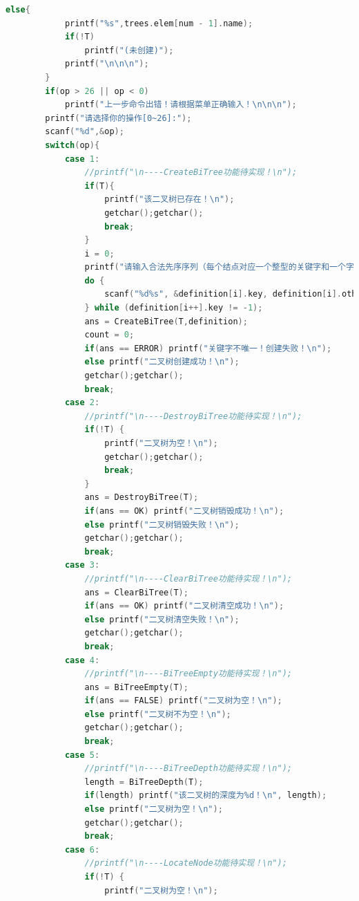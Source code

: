 \documentclass[supercite]{Experimental_Report}
\theoremstyle{definition}
\begin{document}
\begin{lstlisting}[language=c]
        else{
        	printf("%s",trees.elem[num - 1].name);
        	if(!T)
                printf("(未创建)");
            printf("\n\n\n");
		}   
        if(op > 26 || op < 0)
            printf("上一步命令出错！请根据菜单正确输入！\n\n\n");
        printf("请选择你的操作[0~26]:");
        scanf("%d",&op);
        switch(op){
            case 1:
                //printf("\n----CreateBiTree功能待实现！\n");
                if(T){
                    printf("该二叉树已存在！\n");
                    getchar();getchar();
                    break;
                }
                i = 0;
                printf("请输入合法先序序列（每个结点对应一个整型的关键字和一个字符串，当关键字为0时，表示空子树，为-1表示输入结束）：");
                do {
                    scanf("%d%s", &definition[i].key, definition[i].others);
                } while (definition[i++].key != -1);
                ans = CreateBiTree(T,definition);
                count = 0;
                if(ans == ERROR) printf("关键字不唯一！创建失败！\n");
                else printf("二叉树创建成功！\n");
                getchar();getchar();
                break;
            case 2:
                //printf("\n----DestroyBiTree功能待实现！\n");
                if(!T) {
                    printf("二叉树为空！\n");
                    getchar();getchar();
                    break;
                }
                ans = DestroyBiTree(T);
                if(ans == OK) printf("二叉树销毁成功！\n");
                else printf("二叉树销毁失败！\n");
                getchar();getchar();
                break;    
            case 3:
                //printf("\n----ClearBiTree功能待实现！\n");
                ans = ClearBiTree(T);
                if(ans == OK) printf("二叉树清空成功！\n");
                else printf("二叉树清空失败！\n");
                getchar();getchar();
                break;
           	case 4:
                //printf("\n----BiTreeEmpty功能待实现！\n");
                ans = BiTreeEmpty(T);
                if(ans == FALSE) printf("二叉树为空！\n");
                else printf("二叉树不为空！\n");
                getchar();getchar();
                break;
            case 5:
                //printf("\n----BiTreeDepth功能待实现！\n");
                length = BiTreeDepth(T);
                if(length) printf("该二叉树的深度为%d！\n", length);
                else printf("二叉树为空！\n");
                getchar();getchar();
                break;
            case 6:
                //printf("\n----LocateNode功能待实现！\n");
                if(!T) {
                    printf("二叉树为空！\n");

\end{lstlisting}
\end{document}
